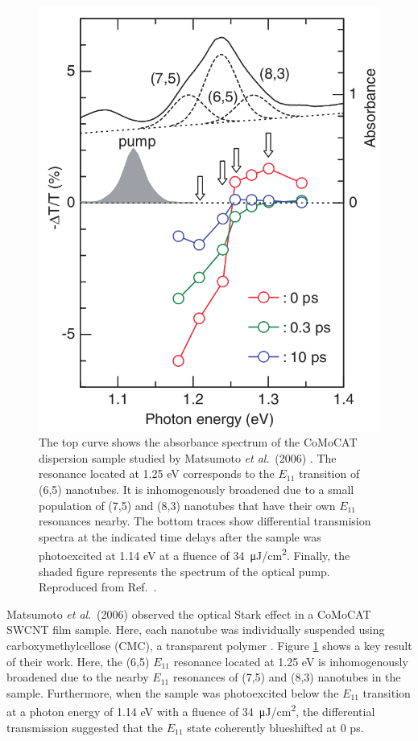 \begin{figure}[H]
	\centering
	\includegraphics[scale=1.25]{images/chapter_prior_works/abs_dtt_matsumoto}
	\caption{The top curve shows the absorbance spectrum of the CoMoCAT dispersion sample studied by Matsumoto \textit{et al}.\ (2006) \cite{matsumoto2006optical}. The resonance located at 1.25 eV corresponds to the $E_{11}$ transition of (6,5) nanotubes. It is inhomogenously broadened due to a small population of (7,5) and (8,3) nanotubes that have their own $E_{11}$ resonances nearby. The bottom traces show differential transmision spectra at the indicated time delays after the sample was photoexcited at 1.14 eV at a fluence of \SI{34}{\micro \joule / \cm\squared}. Finally, the shaded figure represents the spectrum of the optical pump. Reproduced from Ref.\ \cite{matsumoto2006optical}.}
	\label{fig:abs_dtt_matsumoto}
\end{figure}

Matsumoto \textit{et al}.\ (2006) \cite{matsumoto2006optical} observed the optical Stark effect in a CoMoCAT SWCNT film sample. Here, each nanotube was individually suspended using carboxymethylcellose (CMC), a transparent polymer \cite{matsumoto2006optical}. Figure \ref{fig:abs_dtt_matsumoto} shows a key result of their work. Here, the (6,5) $E_{11}$ resonance located at 1.25 eV is inhomogenously broadened due to the nearby $E_{11}$ resonances of (7,5) and (8,3) nanotubes in the sample. Furthermore, when the sample was photoexcited below the $E_{11}$ transition at a photon energy of 1.14 eV with a fluence of \SI{34}{\micro \joule / \cm\squared}, the differential transmission suggested that the $E_{11}$ state coherently blueshifted at 0 ps.

